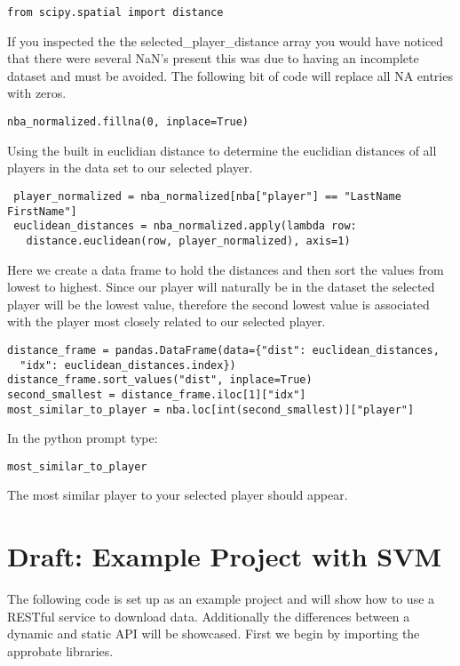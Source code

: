  \begin{lstlisting}
from scipy.spatial import distance
\end{lstlisting} 

If you inspected the the selected\_player\_distance array you would have
noticed that there were several NaN's present this was due to having
an incomplete dataset and must be avoided. The following bit of code
will replace all NA entries with zeros. 

 \begin{lstlisting}
nba_normalized.fillna(0, inplace=True)
\end{lstlisting} 

Using the built in euclidian distance to determine the euclidian
distances of all players in the data set to our selected player.

 \begin{lstlisting}
 player_normalized = nba_normalized[nba["player"] == "LastName FirstName"]
 euclidean_distances = nba_normalized.apply(lambda row:
   distance.euclidean(row, player_normalized), axis=1)
\end{lstlisting} 

Here we create a data frame to hold the distances and then sort the
values from lowest to highest. Since our player will naturally be in
the dataset the selected player will be the lowest value, therefore
the second lowest value is associated with the player most closely
related to our selected player.

\begin{lstlisting}
distance_frame = pandas.DataFrame(data={"dist": euclidean_distances,
  "idx": euclidean_distances.index})
distance_frame.sort_values("dist", inplace=True)
second_smallest = distance_frame.iloc[1]["idx"]
most_similar_to_player = nba.loc[int(second_smallest)]["player"]
\end{lstlisting} 

In the python prompt type: 

\begin{lstlisting}
most_similar_to_player 
\end{lstlisting} 

The most similar player to your selected player should appear. 

\section{Draft: Example Project with SVM}

The following code is set up as an example project and will show how
to use a RESTful service to download data. Additionally the
differences between a dynamic and static API will be showcased. First
we begin by importing the approbate libraries. 

